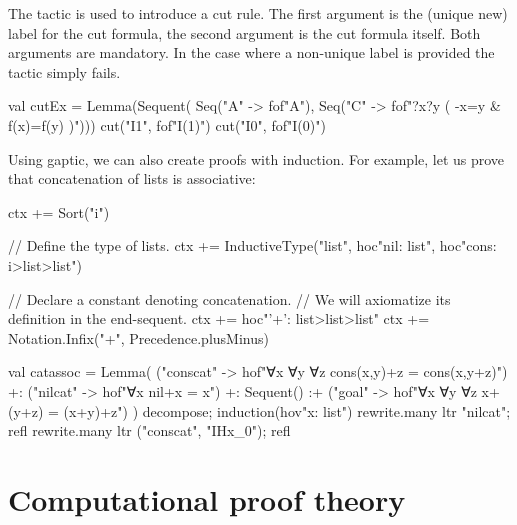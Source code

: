 \documentclass[a4paper,11pt]{book}
\newcommand{\cli}[1]{{\ttfamily {#1}}}
\begin{document}
The \cli{cut} tactic is used to introduce a cut rule. The first argument is the
(unique new) label for the cut formula, the second argument is the cut formula
itself. Both arguments are mandatory. In the case where a non-unique label is
provided the tactic simply fails.
\begin{tacticslisting}
  val cutEx = Lemma(Sequent(
  Seq("A" -> fof"A"),
  Seq("C" -> fof"?x?y ( -x=y & f(x)=f(y) )"))) {
      cut("I1", fof"I(1)")
      cut("I0", fof"I(0)")
    }
\end{tacticslisting}

Using gaptic, we can also create proofs with induction.  For example, let us
prove that concatenation of lists is associative:

\begin{tacticslisting}[nosig]
  ctx += Sort("i")

  // Define the type of lists.
  ctx += InductiveType("list",
  hoc"nil: list",
  hoc"cons: i>list>list")

  // Declare a constant denoting concatenation.
  // We will axiomatize its definition in the end-sequent.
  ctx += hoc"'+': list>list>list"
  ctx += Notation.Infix("+", Precedence.plusMinus)

  val catassoc =
  Lemma(
  ("conscat" -> hof"∀x ∀y ∀z cons(x,y)+z = cons(x,y+z)") +:
  ("nilcat" -> hof"∀x nil+x = x") +:
  Sequent()
  :+ ("goal" -> hof"∀x ∀y ∀z x+(y+z) = (x+y)+z")
  ) {
      decompose; induction(hov"x: list")
      rewrite.many ltr "nilcat"; refl
      rewrite.many ltr ("conscat", "IHx_0"); refl
    }
\end{tacticslisting}
\begin{tacticsoutput}
\end{tacticsoutput}


\chapter{Computational proof theory}
\end{document}
